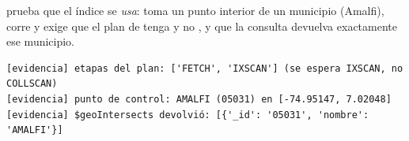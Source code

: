  prueba que el índice se \emph{usa}: toma un punto interior
de un municipio (Amalfi), corre  y exige que el plan de
 tenga  y no , y que la consulta
devuelva exactamente ese municipio.

\begin{lstlisting}
[evidencia] etapas del plan: ['FETCH', 'IXSCAN'] (se espera IXSCAN, no COLLSCAN)
[evidencia] punto de control: AMALFI (05031) en [-74.95147, 7.02048]
[evidencia] $geoIntersects devolvió: [{'_id': '05031', 'nombre': 'AMALFI'}]
\end{lstlisting}

